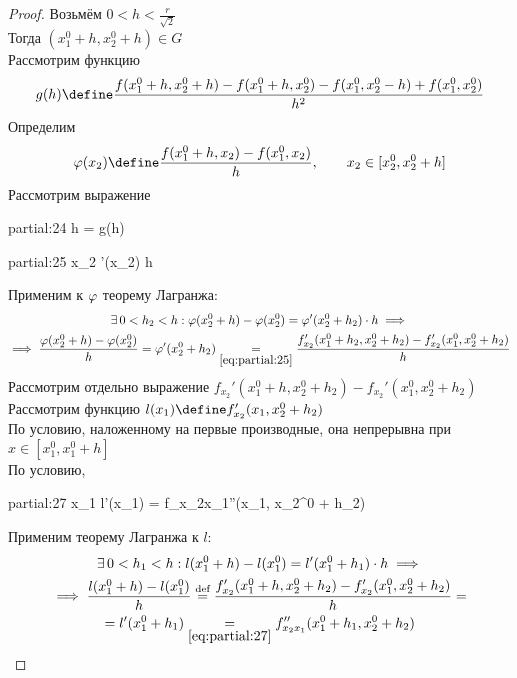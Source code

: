 \begin{proof}
	Возьмём $ 0 < h < \frac{r}{\sqrt2} $ \\
	Тогда $ (x_1^0 + h, x_2^0 + h) \in G $ \\
	Рассмотрим функцию
	$$ g(h) \define \frac{f(x_1^0 + h, x_2^0 + h) - f(x_1^0 + h, x_2^0) - f(x_1^0, x_2^0 - h) + f(x_1^0, x_2^0)}{h^2} $$
	Определим
	$$ \vphi(x_2) \define \frac{f(x_1^0 + h, x_2) - f(x_1^0, x_2)}h, \qquad x_2 \in [x_2^0, x_2^0 + h] $$
	Рассмотрим выражение
	\begin{equ}{partial:24}
		h \bdefeq\vphi {} = g(h)
	\end{equ}
	\begin{equ}{partial:25}
		\forall x_2 \in [x_2^0, x_2^0 + h] \quad \exist \vphi'(x_2) \bdefeq\vphi {}h
	\end{equ}
	Применим к $ \varphi $ теорему Лагранжа:
	\begin{multline}\lbl{partial:27'}
		\exist 0 < h_2 < h : \vphi(x_2^0 + h) - \vphi(x_2^0) = \vphi'(x_2^0 + h_2) \cdot h \implies \\
		\implies \frac{\vphi(x_2^0 + h) - \vphi(x_2^0)}h = \vphi'(x_2^0 + h_2) \underset{\eref{partial:25}}= \frac{f_{x_2}'(x_1^0 + h_2, x_2^0 + h_2) - f_{x_2}'(x_1^0, x_2^0 + h_2)}h
	\end{multline}
	Рассмотрим отдельно выражение $ f_{x_2}'(x_1^0 + h, x_2^0 + h_2) - f_{x_2}'(x_1^0, x_2^0 + h_2) $ \\
	Рассмотрим функцию $ l(x_1) \define f_{x_2}'(x_1, x_2^0 + h_2) $ \\
	По условию, наложенному на первые производные, она непрерывна при $ x \in [x_1^0, x_1^0 + h] $ \\
	По условию,
	\begin{equ}{partial:27}
		\forall x_1 \in [x_1^0, x_1^0 + h] \quad \exist l'(x_1) = f_{x_2x_1}''(x_1, x_2^0 + h_2)
	\end{equ}
	Применим теорему Лагранжа к $ l $:
	\begin{multline}\lbl{partial:29}
		\exist 0 < h_1 < h : l(x_1^0 + h) - l(x_1^0) = l'(x_1^0 + h_1) \cdot h \implies \\
		\implies \frac{l(x_1^0 + h) - l(x_1^0)}h \bydef \frac{f_{x_2}'(x_1^0 + h, x_2^0 + h_2) - f_{x_2}'(x_1^0, x_2^0 + h_2)}h = \\
		= l'(x_1^0 + h_1) \underset{\eref{partial:27}}= f_{x_2x_1}''(x_1^0 + h_1, x_2^0 + h_2)

\end{multline}
\end{proof}
